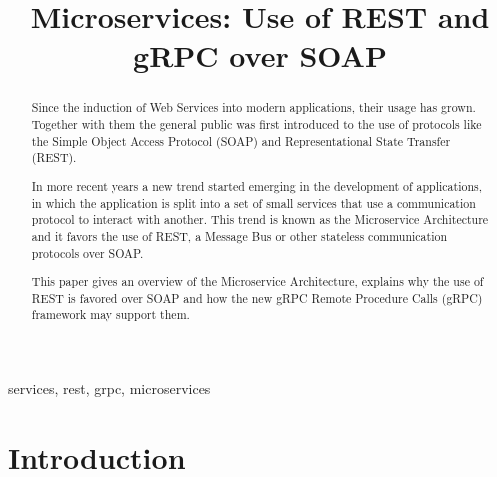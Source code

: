 \documentclass[conference]{IEEEtran}
\begin{document}


\title{Microservices: Use of REST and gRPC over SOAP}

\author{
\and
{}
}

\maketitle

\begin{abstract}

Since the induction of Web Services into modern applications, their usage has grown. Together with them the general public was first introduced to the use of protocols like the Simple Object Access Protocol (SOAP) and Representational State Transfer (REST).

In more recent years a new trend started emerging in the development of applications, in which the application is split into a set of small services that use a communication protocol to interact with another. This trend is known as the Microservice Architecture and it favors the use of REST, a Message Bus or other stateless communication protocols over SOAP.

This paper gives an overview of the Microservice Architecture, explains why the use of REST is favored over SOAP and how the new gRPC Remote Procedure Calls (gRPC) framework may support them.

\end{abstract}

\begin{IEEEkeywords}
services, rest, grpc, microservices
\end{IEEEkeywords}

\section{Introduction}
\end{document}
